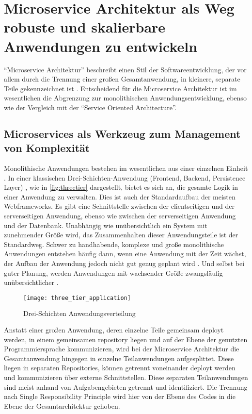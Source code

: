 \chapter{Microservice Architektur als Weg robuste und skalierbare Anwendungen zu entwickeln}
``Microservice Architektur'' beschreibt einen Stil der Softwareentwicklung, der vor allem durch die Trennung einer großen Gesamtanwendung, in kleinere, separate Teile gekennzeichnet ist \cite[vgl.][Seite 2]{newman2015building}.
Entscheidend für die Microservice Architektur ist im wesentlichen die Abgrenzung zur monolithischen Anwendungsentwicklung, ebenso wie der Vergleich mit der ``Service Oriented Architecture''.

\section{Microservices als Werkzeug zum Management von Komplexität}
Monolithische Anwendungen bestehen im wesentlichen aus einer einzelnen Einheit \cite[vgl.][]{Fowler:Intro}. In einer klassischen Drei-Schichten-Anwendung (Frontend, Backend, Persistence Layer) \cite[vgl.][]{MSDN:TTA}, wie in \autoref{fig:threetier} dargestellt, bietet es sich an, die gesamte Logik in einer Anwendung zu verwalten. Dies ist auch der Standardaufbau der meisten Webframeworks. Es gibt eine Schnittstelle zwischen der clientseitigen und der serverseitigen Anwendung, ebenso wie zwischen der serverseitigen Anwendung und der Datenbank. Unabhängig wie unübersichtlich ein System mit zunehmender Größe wird, das Zusammenhalten dieser Anwendungsteile ist der Standardweg. Schwer zu handhabende, komplexe und große monolithische Anwendungen entstehen häufig dann, wenn eine Anwendung mit der Zeit wächst, der Aufbau der Anwendung jedoch nicht gut genug geplant wird \cite[vgl.][]{infaktuell}. Und selbst bei guter Planung, werden Anwendungen mit wachsender Größe zwangsläufig unübersichtlicher \cite[vgl.][]{infaktuell}.
\begin{figure}[!ht]
    \caption{Drei-Schichten Anwendungsverteilung \cite{ThreeTieredDistribution}}
    \label{fig:threetier}
    \texttt{[image: three\_tier\_application]}
\end{figure}

Anstatt einer großen Anwendung, deren einzelne Teile gemeinsam deployt werden, in einem gemeinsamen repository liegen und auf der Ebene der genutzten Programmiersprache kommunizieren, wird bei der Microservice Architektur die Gesamtanwendung hingegen in einzelne Teilanwendungen aufgesplittet. Diese liegen in separaten Repositories, können getrennt voneinander deployt werden und kommunizieren über externe Schnittstellen. Diese separaten Teilanwendungen sind meist anhand von Aufgabengebieten getrennt und identifiziert. Die Trennung nach Single Responsibility Principle \cite[vgl.][Seite 108]{Martin:SRP} wird hier von der Ebene des Codes in die Ebene der Gesamtarchitektur gehoben.

